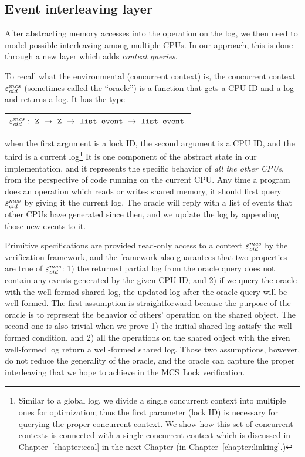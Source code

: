\subsection{Event interleaving layer}
\label{chapter:mcslock:subsec:abstractoperationlayer}

After abstracting memory accesses into the operation on the log, we
then need to model possible interleaving among multiple CPUs. In
our approach, this is done through a new layer which adds \emph{context queries}.

To recall what the environmental (concurrent context) is,
the concurrent context ${\varepsilon}^{mcs}_{cid}$ (sometimes called the ``oracle'') is
a function that gets  a CPU ID and a log and returns a log.
It has the type\newline
\begin{tabular}{P{0.95\textwidth}}
    $\oracle^{mcs}_{cid}:\  \codeinmath{Z}\ \rightarrow \ \codeinmath{Z}\ \rightarrow\ \codeinmath{list event}\ \rightarrow\ \codeinmath{list event}.$\\
\end{tabular}\newline
when the first argument is a lock ID, the second argument is a CPU ID, and the third is a current log\footnote{Similar to a global log, we divide a single concurrent context into multiple ones for optimization; thus the first parameter (lock ID) is necessary for querying the proper concurrent context. We show how this set of concurrent contexts is connected with a single concurrent context which is discussed in Chapter~\ref{chapter:ccal} in the next Chapter (in Chapter~\ref{chapter:linking}.)} 
It is one component of the abstract state in our implementation, and it represents the specific behavior of \emph{all
the other CPUs}, from the perspective of code running on the current
CPU.  Any time a program does an operation which reads or writes
shared memory, it should first query ${\varepsilon}^{mcs}_{cid}$ by giving it the
current log. The oracle will reply with a list of events that other
CPUs have generated since then, and we update the log by appending
those new events to it.

Primitive specifications are provided read-only access to a context
${\varepsilon}^{mcs}_{cid}$ by the verification framework, and the framework also
guarantees that two properties are true of ${\varepsilon}^{mcs}_{cid}$: 1) the returned
partial log from the oracle query does not contain any events
generated by the given CPU ID; and 2) if we query the oracle with the
well-formed shared log, the updated log after the oracle query will
be well-formed.
The first assumption is straightforward because the purpose of the oracle is to represent the behavior of others' operation on the shared object.
The second one is also trivial when we prove 1) the initial shared log satisfy the well-formed condition, and 2) all the operations on the shared object with the given well-formed log return a well-formed shared log.
Those two assumptions, however, do not reduce the generality of the oracle, and the oracle can capture the proper interleaving that we hope to achieve in the $\mathrm{MCS}$ Lock verification.

